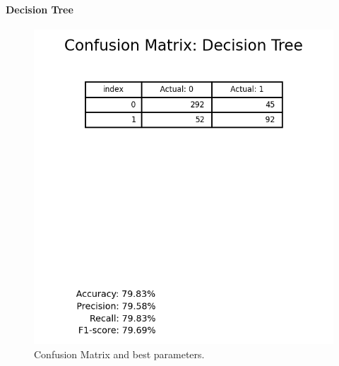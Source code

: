             \paragraph{Decision Tree}
                \begin{figure}[H]
                        \centering
                        \includegraphics[scale=1]{images/dm_confu_mat_deci_tree}
                        \caption{Confusion Matrix and best parameters.}
                        \label{fig:dm-decision-tree}
                \end{figure}
